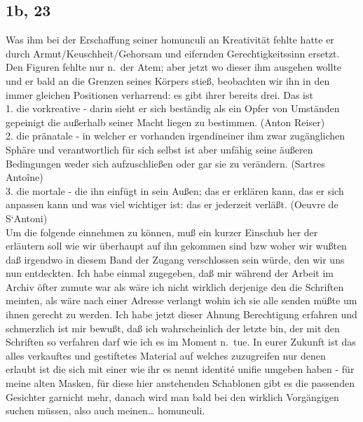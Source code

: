 \documentclass[
]{article}
\author{}
\date{\vspace{-2.5em}}
\begin{document}
\subsection{1b, 23}\label{b-23}

Was ihm bei der Erschaffung seiner homunculi an Kreativität fehlte hatte
er durch Armut/Keuschheit/Gehorsam und eifernden Gerechtigkeitssinn
ersetzt. Den Figuren fehlte nur n.~der Atem; aber jetzt wo dieser ihm
ausgehen wollte und er bald an die Grenzen seines Körpers stieß,
beobachten wir ihn in den immer gleichen Positionen verharrend: es gibt
ihrer bereits drei. Das ist\\
1. die vorkreative - darin sieht er sich beständig als ein Opfer von
Umständen gepeinigt die außerhalb seiner Macht liegen zu bestimmen.
(Anton Reiser)\\
2. die pränatale - in welcher er vorhanden irgendineiner ihm zwar
zugänglichen Sphäre und verantwortlich für sich selbst ist aber unfähig
seine äußeren Bedingungen weder sich aufzuschließen oder gar sie zu
verändern. (Sartres Antoîne)\\
3. die mortale - die ihn einfügt in sein Außen; das er erklären kann,
das er sich anpassen kann und was viel wichtiger ist: das er jederzeit
verläßt. (Oeuvre de S`Antoni)\\
Um die folgende einnehmen zu können, muß ein kurzer Einschub her der
erläutern soll wie wir überhaupt auf ihn gekommen sind bzw woher wir
wußten daß irgendwo in diesem Band der Zugang verschlossen sein würde,
den wir uns nun entdeckten. Ich habe einmal zugegeben, daß mir während
der Arbeit im Archiv öfter zumute war als wäre ich nicht wirklich
derjenige den die Schriften meinten, als wäre nach einer Adresse
verlangt wohin ich sie alle senden müßte um ihnen gerecht zu werden. Ich
habe jetzt dieser Ahnung Berechtigung erfahren und schmerzlich ist mir
bewußt, daß ich wahrscheinlich der letzte bin, der mit den Schriften so
verfahren darf wie ich es im Moment n.~tue. In eurer Zukunft ist das
alles verkauftes und gestiftetes Material auf welches zuzugreifen nur
denen erlaubt ist die sich mit einer wie ihr es nennt identité unifie
umgeben haben - für meine alten Masken, für diese hier anstehenden
Schablonen gibt es die passenden Gesichter garnicht mehr, danach wird
man bald bei den wirklich Vorgängigen suchen müssen, also auch
meinen\ldots{} homunculi.
\end{document}
